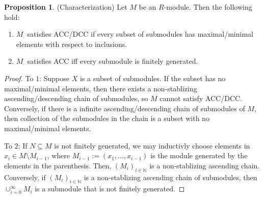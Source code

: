 \documentclass{article}
\theoremstyle{definition}
\theoremstyle{definition}
\theoremstyle{definition}
\newtheorem{proposition}{Proposition}[section]
\theoremstyle{definition}
\theoremstyle{definition}
\theoremstyle{definition}
\theoremstyle{definition}
\begin{document}
\begin{tcolorbox}[colback=blue!5!white,colframe=blue!30!white]
\begin{proposition}
(Characterization) Let $M$ be an $R$-module. Then the following hold: 
\begin{enumerate}
    \item $M_{\cdot}$ satisfies ACC/DCC if every subset of submodules has maximal/minimal elements with respect to inclusions.
    \item $M_{\cdot}$ satisfies ACC iff every submodule is finitely generated. 
\end{enumerate}
\end{proposition}
\end{tcolorbox}
\begin{proof}
    To $1$: Suppose $X$ is a subset of submodules. If the subset has no maximal/minimal elements, then there exists a non-stablizing ascending/descending chain of submodules, so $M$ cannot satisfy ACC/DCC. Conversely, if there is a infinite ascending/descending chain of submodules of $M$, then collection of the submodules in the chain is a subset with no maximal/minimal elements. 

    To $2$: If $N\subseteq M$ is not finitely generated, we may inductivly choose elements in $x_i\in M\setminus M_{i-1}$, where $ M_{i-1}:=(x_1,...,x_{i-1})$ is the module generated by the elements in the parenthesis. Then, $(M_i)_{i\in \mathbb{N}}$ is a non-stablizing ascending chain. Conversely, if $(M_i)_{i\in \mathbb{N}}$ is a non-stablizing ascending chain of submodules, then $\cup_{i=0}^{\infty} M_i$ is a submodule that is not finitely generated. 
\end{proof}
\end{document}
